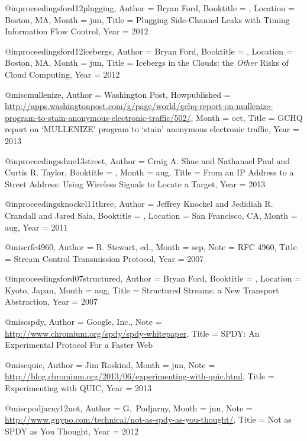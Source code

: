 {{{{{{{{{@inproceedings{ford12plugging,
	Author = {Bryan Ford},
	Booktitle = {},
	Location = {Boston, MA},
	Month = jun,
	Title = {Plugging Side-Channel Leaks with Timing Information Flow Control},
	Year = 2012}

@inproceedings{ford12icebergs,
	Author = {Bryan Ford},
	Booktitle = {},
	Location = {Boston, MA},
	Month = jun,
	Title = {Icebergs in the Clouds: the {\em Other} Risks of Cloud Computing},
	Year = 2012}

@misc{mullenize,
	Author = {Washington Post},
	Howpublished = {\url{http://apps.washingtonpost.com/g/page/world/gchq-report-on-mullenize-program-to-stain-anonymous-electronic-traffic/502/}},
	Month = {oct},
	Title = {{GCHQ} report on {`MULLENIZE'} program to `stain' anonymous electronic traffic},
	Year = {2013}}

@inproceedings{shue13street,
	Author = {Craig A. Shue and Nathanael Paul and Curtis R. Taylor},
	Booktitle = {},
	Month = aug,
	Title = {From an {IP} Address to a Street Address: Using Wireless Signals to Locate a Target},
	Year = 2013}

@inproceedings{knockel11three,
	Author = {Jeffrey Knockel and Jedidiah R. Crandall and Jared Saia},
	Booktitle = {},
	Location = {San Francisco, CA},
	Month = aug,
	Year = 2011}

@misc{rfc4960,
	Author = {R. {Stewart, ed.}},
	Month = sep,
	Note = {RFC 4960},
	Title = {Stream Control Transmission Protocol},
	Year = 2007}

@inproceedings{ford07structured,
	Author = {Bryan Ford},
	Booktitle = {},
	Location = {Kyoto, Japan},
	Month = aug,
	Title = {Structured Streams: a New Transport Abstraction},
	Year = {2007}}

@misc{spdy,
	Author = {Google, Inc.},
	Note = {\url{http://www.chromium.org/spdy/spdy-whitepaper}},
	Title = {{SPDY}: An Experimental Protocol For a Faster {Web}}}

@misc{quic,
	Author = {Jim Roskind},
	Month = jun,
	Note = {\url{http://blog.chromium.org/2013/06/experimenting-with-quic.html}},
	Title = {Experimenting with {QUIC}},
	Year = 2013}

@misc{podjarny12not,
	Author = {G.~Podjarny},
	Month = jun,
	Note = {\url{http://www.guypo.com/technical/not-as-spdy-as-you-thought/}},
	Title = {{Not as SPDY as You Thought}},
	Year = 2012}

}}}}}}}}}
